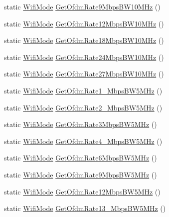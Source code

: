 \begin{DoxyCompactItemize}
static \hyperlink{classns3_1_1WifiMode}{Wifi\+Mode} \hyperlink{classns3_1_1WifiPhy_af3db6741fde3d02c6982a62069329c9c}{Get\+Ofdm\+Rate9\+Mbps\+B\+W10\+M\+Hz} ()
\item 
static \hyperlink{classns3_1_1WifiMode}{Wifi\+Mode} \hyperlink{classns3_1_1WifiPhy_a7027b0e5307e56e68d4cf222e6751d90}{Get\+Ofdm\+Rate12\+Mbps\+B\+W10\+M\+Hz} ()
\item 
static \hyperlink{classns3_1_1WifiMode}{Wifi\+Mode} \hyperlink{classns3_1_1WifiPhy_a78790cdcd17992e4c5e3ffada193d6de}{Get\+Ofdm\+Rate18\+Mbps\+B\+W10\+M\+Hz} ()
\item 
static \hyperlink{classns3_1_1WifiMode}{Wifi\+Mode} \hyperlink{classns3_1_1WifiPhy_a9cb82b2a3b8165a9b1c58a4cbcbd961f}{Get\+Ofdm\+Rate24\+Mbps\+B\+W10\+M\+Hz} ()
\item 
static \hyperlink{classns3_1_1WifiMode}{Wifi\+Mode} \hyperlink{classns3_1_1WifiPhy_adeb11bf3d1463a29e9e930e69d02df43}{Get\+Ofdm\+Rate27\+Mbps\+B\+W10\+M\+Hz} ()
\item 
static \hyperlink{classns3_1_1WifiMode}{Wifi\+Mode} \hyperlink{classns3_1_1WifiPhy_ad52da7bd50e91c3cf45b6a3256b93d37}{Get\+Ofdm\+Rate1\+\_\+Mbps\+B\+W5\+M\+Hz} ()
\item 
static \hyperlink{classns3_1_1WifiMode}{Wifi\+Mode} \hyperlink{classns3_1_1WifiPhy_af1b2d75c0ca6b23927ddee3b3f85242e}{Get\+Ofdm\+Rate2\+\_\+Mbps\+B\+W5\+M\+Hz} ()
\item 
static \hyperlink{classns3_1_1WifiMode}{Wifi\+Mode} \hyperlink{classns3_1_1WifiPhy_a80fcdb4c3168baf71ced3a7088aa24b7}{Get\+Ofdm\+Rate3\+Mbps\+B\+W5\+M\+Hz} ()
\item 
static \hyperlink{classns3_1_1WifiMode}{Wifi\+Mode} \hyperlink{classns3_1_1WifiPhy_a0d0270d2a2fc0a3b91d8e39c83d8f0ca}{Get\+Ofdm\+Rate4\+\_\+Mbps\+B\+W5\+M\+Hz} ()
\item 
static \hyperlink{classns3_1_1WifiMode}{Wifi\+Mode} \hyperlink{classns3_1_1WifiPhy_aa5cfec7cdcc8892c9b5787b81135c177}{Get\+Ofdm\+Rate6\+Mbps\+B\+W5\+M\+Hz} ()
\item 
static \hyperlink{classns3_1_1WifiMode}{Wifi\+Mode} \hyperlink{classns3_1_1WifiPhy_a2082d83ca110002cea0a944f57bb3433}{Get\+Ofdm\+Rate9\+Mbps\+B\+W5\+M\+Hz} ()
\item 
static \hyperlink{classns3_1_1WifiMode}{Wifi\+Mode} \hyperlink{classns3_1_1WifiPhy_aae849d28ac0ef8729574e39f1bf98463}{Get\+Ofdm\+Rate12\+Mbps\+B\+W5\+M\+Hz} ()
\item 
static \hyperlink{classns3_1_1WifiMode}{Wifi\+Mode} \hyperlink{classns3_1_1WifiPhy_a54081f3923272965099c04f060b0508d}{Get\+Ofdm\+Rate13\+\_\+Mbps\+B\+W5\+M\+Hz} ()

\end{DoxyCompactItemize}
